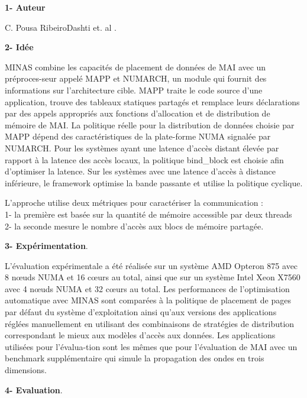 \textbf{1- Auteur}

C. Pousa RibeiroDashti et. al \cite{MINAS76}.

\textbf{2- Idée}

MINAS combine les capacités de placement de données de MAI avec un préproces-seur appelé MAPP et NUMARCH, un module qui fournit des informations sur l'architecture cible. 
MAPP traite le code source d'une application, trouve des tableaux statiques partagés et remplace leurs déclarations par des appels appropriés aux fonctions d'allocation et de distribution de mémoire de MAI. 
La politique réelle pour la distribution de données choisie par MAPP dépend des caractéristiques de la plate-forme NUMA signalée par NUMARCH. 
Pour les systèmes ayant une latence d'accès distant élevée par rapport à la latence des accès locaux, la politique bind\_block est choisie afin d'optimiser la latence. 
Sur les systèmes avec une latence d'accès à distance inférieure, le framework optimise la bande passante et utilise la politique cyclique. 

L'approche utilise deux métriques pour caractériser la communication : \\
1- la première est basée sur la quantité de mémoire accessible par deux threads \\
2- la seconde mesure le nombre d'accès aux blocs de mémoire partagée. 

\textbf{3- Expérimentation}.

L'évaluation expérimentale a été réalisée sur un système AMD Opteron 875 avec 8 nœuds NUMA et 16 cœurs au total, ainsi que sur un système Intel Xeon X7560 avec 4 nœuds NUMA et 32 cœurs au total. 
Les performances de l'optimisation automatique avec MINAS sont comparées à la politique de placement de pages par défaut du système d'exploitation ainsi qu'aux versions des applications réglées manuellement en utilisant des combinaisons de stratégies de distribution correspondant le mieux aux modèles d'accès aux données. 
Les applications utilisées pour l'évalua-tion sont les mêmes que pour l'évaluation de MAI avec un benchmark supplémentaire qui simule la propagation des ondes en trois dimensions. 

\textbf{4- Evaluation}. 

